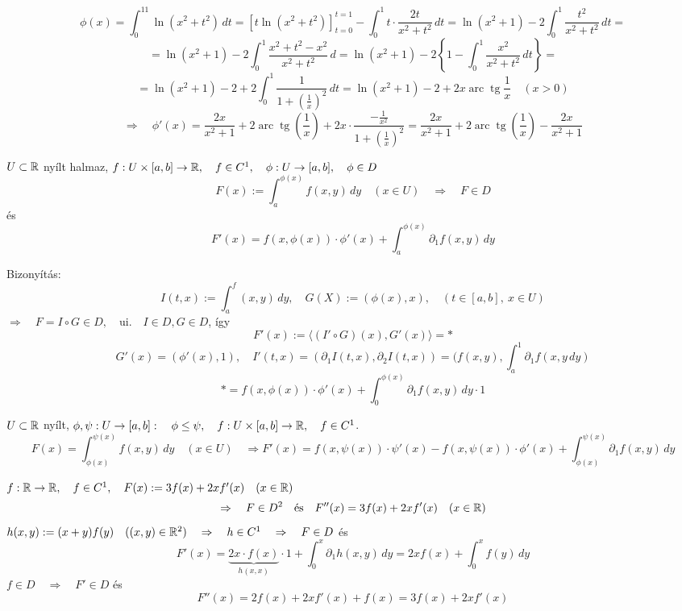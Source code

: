 \documentclass[a4paper,11.5pt]{article}
\DeclareMathOperator{\tg}{tg}
\DeclareMathOperator{\arc}{arc}
\begin{document}
	\begin{note}
		$$\phi(x)=\int_0^11\ln(x^2+t^2)\,dt=[t\ln(x^2+t^2)]_{t=0}^{t=1}-\int_0^1t\cdot\frac{2t}{x^2+t^2}\,dt=\ln(x^2+1)-2\int_0^1\frac{t^2}{x^2+t^2}\,dt=$$
		$$=\ln(x^2+1)-2\int_0^1\frac{x^2+t^2-x^2}{x^2+t^2}\,d=\ln(x^2+1)-2\left\{ 1-\int_0^1\frac{x^2}{x^2+t^2}\,dt \right\}=$$ $$=\ln(x^2+1)-2+2\int_0^1\frac{1}{1+\left(\frac{1}{x}\right)^2}\,dt=\ln(x^2+1)-2+2x\arc\tg\frac{1}{x}\quad (x>0)$$
		$$\Rightarrow\quad \phi'(x)=\frac{2x}{x^2+1}+2\arc\tg\left(\frac{1}{x}\right)+2x\cdot\frac{-\frac{1}{x^2}}{1+\left(\frac{1}{x}\right)^2}=\frac{2x}{x^2+1}+2\arc\tg\left(\frac{1}{x}\right)-\frac{2x}{x^2+1}$$
	\end{note}
	\begin{theorem}
		$U\subset\mathbb{R}$ nyílt halmaz, $f:U\times[a,b]\to\mathbb{R},\quad f\in C^1,\quad \phi:U\to[a,b],\quad \phi\in D$
		\[ F(x):=\int_a^{\phi(x)}f(x,y)\,dy\quad (x\in U)\quad \Rightarrow\quad F\in D \]
		és
		\[ F'(x)=f(x,\phi(x))\cdot\phi'(x)+\int_a^{\phi(x)}\partial_1 f(x,y)\,dy \]
		
		Bizonyítás: 
		\[ I(t,x):=\int_a^f(x,y) \,dy,\quad G(X):=(\phi(x),x),\quad (t\in[a,b],\ x\in U) \]
		$ \Rightarrow\quad F=I\circ G\in D,\quad \text{ui.}\quad I\in D, G\in D$, így
		\[ F'(x):=\langle (I'\circ G)(x),G'(x)\rangle=* \]
		\[ G'(x)=(\phi'(x),1),\quad I'(t,x)=(\partial_1I(t,x),\partial_2I(t,x))=(f(x,y),\int_a^1\partial_1f\left(x,y\,dy\right) \]
		\[ *=f(x,\phi(x))\cdot \phi'(x)+\int_0^{\phi(x)}\partial_1f(x,y)\,dy\cdot1 \]
	\end{theorem}
	\begin{note}
		$U\subset\mathbb{R}$ nyílt, $\phi, \psi:U\to[a,b]:\quad \phi\leq\psi,\quad f:U\times[a,b]\to\mathbb{R},\quad f\in C^1$.
		\[ F(x)=\int_{\phi(x)}^{\psi(x)}f(x,y)\,dy\quad (x\in U)\quad \Rightarrow F'(x)=f(x,\psi(x))\cdot\psi'(x)-f(x,\psi(x))\cdot\phi'(x)+\int_{\phi(x)}^{\psi(x)}\partial_1f(x,y)\,dy \]
	\end{note}
	\begin{example}
		$f:\mathbb{R}\to\mathbb{R},\quad f\in C^1,\quad F(x):=3f(x)+2xf'(x)\quad (x\in\mathbb{R})$
		\[ \Rightarrow\quad F\in D^2\quad \text{és}\quad F''(x)=3f(x)+2xf'(x)\quad (x\in\mathbb{R}) \]
		$h(x,y):=(x+y)f(y)\quad ((x,y)\in\mathbb{R}^2)\quad \Rightarrow\quad h\in C^1\quad \Rightarrow\quad F\in D$ és
		\[ F'(x)=\underbrace{2x\cdot f(x)}_{h(x,x)}\cdot1+\int_0^x\partial_1h(x,y)\,dy=2xf(x)+\int_0^xf(y)\,dy \]
		$f\in D\quad \Rightarrow\quad F'\in D$ és 
		\[ F''(x)=2f(x)+2xf'(x)+f(x)=3f(x)+2xf'(x) \]   
	\end{example}
\end{document}
